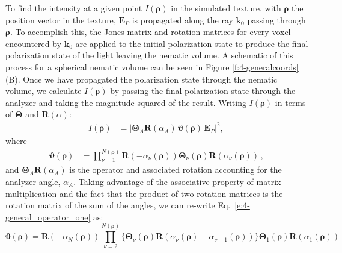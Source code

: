 To find the intensity at a given point $I(\bm{\rho})$ in the simulated texture, with $\mathbf{\rho}$ the position vector in the texture, $\mathbf{E}_P$ is propagated along the ray $\mathbf{k}_0$ passing through $\bm{\rho}$.
To accomplish this, the Jones matrix and rotation matrices for every voxel encountered by $\mathbf{k}_0$ are applied to the initial polarization state to produce the final polarization state of the light leaving the nematic volume.
A schematic of this process for a spherical nematic volume can be seen in Figure \ref{f:4-generalcoords}(B).
Once we have propagated the polarization state through the nematic volume, we calculate $I(\bm{\rho})$ by passing the final polarization state through the analyzer and taking the magnitude squared of the result.
Writing $I(\bm{\rho})$ in terms of $\bm{\Theta}$ and $\mathbf{R}(\alpha)$:
\begin{align}
I(\bm{\rho}) &= |\bm{\Theta}_A \mathbf{R}(\alpha_A)\, \bm{\vartheta}(\bm{\rho}) \, \mathbf{E}_P|^2, \, \label{e:4-Intensity}
\end{align}
where
\begin{align}
        \bm{\vartheta}(\bm{\rho}) &=  \prod\limits_{\nu = 1}^{N(\bm{\rho})}
        \!\mathbf{R}(-\alpha_{\nu}(\bm{\rho})) \bm{\Theta}_{\nu}(\bm{\rho}) \mathbf{R}(\alpha_{\nu}(\bm{\rho}))\,, \label{e:4-general_operator_one}
\end{align}
and $\bm{\Theta}_A \mathbf{R}(\alpha_A)$ is the operator and associated rotation accounting for the analyzer angle, $\alpha_A$.
Taking advantage of the associative property of matrix multiplication and the fact that the product of two rotation matrices is the rotation matrix of the sum of the angles, we can re-write Eq.~\ref{e:4-general_operator_one} as:
\begin{equation}
\bm{\vartheta}(\bm{\rho}) =  \mathbf{R}(-\alpha_{N}(\bm{\rho}))
 \prod\limits_{\nu = 2}^{N(\bm{\rho})}
 \!\Big \{ \bm{\Theta}_{\nu}(\bm{\rho}) \mathbf{R}(\alpha_{\nu}(\bm{\rho})-\alpha_{\nu-1}(\bm{\rho})) \Big \}
 \bm{\Theta}_{1}(\bm{\rho}) \mathbf{R}(\alpha_{1}(\bm{\rho}))\,
\end{equation}

